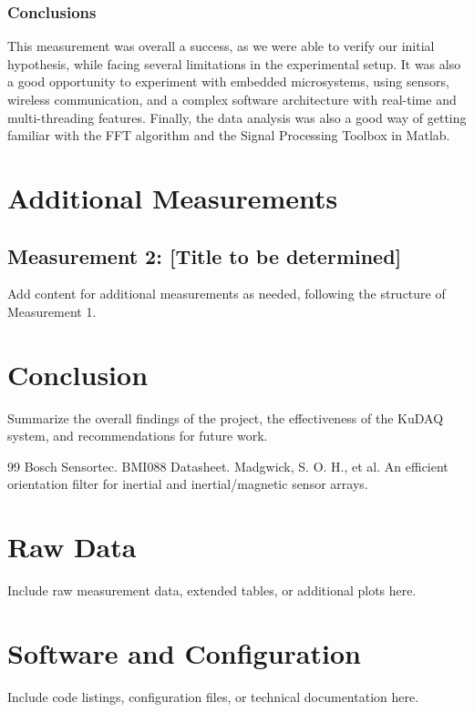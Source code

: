 \documentclass[10pt, a4paper, twocolumn]{article}
\begin{document}
\subsubsection{Conclusions}
This measurement was overall a success, as we were able to verify our initial hypothesis, while facing several limitations in the experimental setup. 
It was also a good opportunity to experiment with embedded microsystems, using sensors, wireless communication, and a complex software architecture with real-time and multi-threading features.
Finally, the data analysis was also a good way of getting familiar with the FFT algorithm and the Signal Processing Toolbox in Matlab. 

\newpage

\section{Additional Measurements}

\subsection{Measurement 2: [Title to be determined]}
\label{sec:measurement2}

Add content for additional measurements as needed, following the structure of Measurement 1.

\newpage

\section{Conclusion}
Summarize the overall findings of the project, the effectiveness of the KuDAQ system, and recommendations for future work.

\newpage

\begin{thebibliography}{99}
     Bosch Sensortec. BMI088 Datasheet.
     Madgwick, S. O. H., et al. An efficient orientation filter for inertial and inertial/magnetic sensor arrays.
\end{thebibliography}

\newpage

\appendix
\section{Raw Data}
Include raw measurement data, extended tables, or additional plots here.

\section{Software and Configuration}
Include code listings, configuration files, or technical documentation here.
\end{document}
